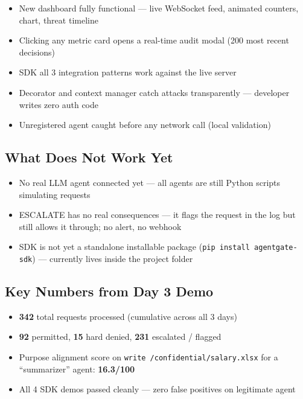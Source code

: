 \documentclass[12pt, a4paper]{article}
\begin{document}
\begin{itemize}[noitemsep]
  \item New dashboard fully functional — live WebSocket feed, animated counters, chart, threat timeline
  \item Clicking any metric card opens a real-time audit modal (200 most recent decisions)
  \item SDK all 3 integration patterns work against the live server
  \item Decorator and context manager catch attacks transparently — developer writes zero auth code
  \item Unregistered agent caught before any network call (local validation)
\end{itemize}

\subsection{What Does Not Work Yet}

\begin{itemize}[noitemsep]
  \item No real LLM agent connected yet — all agents are still Python scripts simulating requests
  \item ESCALATE has no real consequences — it flags the request in the log but still allows it through; no alert, no webhook
  \item SDK is not yet a standalone installable package (\texttt{pip install agentgate-sdk}) — currently lives inside the project folder
\end{itemize}

\subsection{Key Numbers from Day 3 Demo}

\begin{itemize}[noitemsep]
  \item \textbf{342} total requests processed (cumulative across all 3 days)
  \item \textbf{92} permitted, \textbf{15} hard denied, \textbf{231} escalated / flagged
  \item Purpose alignment score on \texttt{write /confidential/salary.xlsx} for a ``summarizer'' agent: \textbf{16.3/100}
  \item All 4 SDK demos passed cleanly — zero false positives on legitimate agent
\end{itemize}
\end{document}
